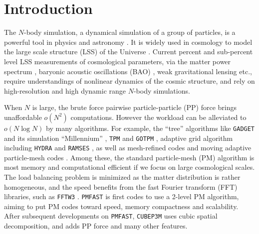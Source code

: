 \documentclass[10pt,twocolumn,preprint]{emulateapj}
\begin{document}
\maketitle


\section{Introduction}\label{s.intro}
The $N$-body simulation, a dynamical simulation of a group of particles, is a powerful tool in physics and astronomy \citep{1988csup.book.....H}. It is widely used in cosmology to model the large scale structure (LSS) of the Universe \citep{1985ApJ...292..371D}. Current percent and sub-percent level LSS measurements of cosmological parameters, via the matter power spectrum \citep{2005MNRAS.360L..82R,2011ApJ...726....7T}, baryonic acoustic oscillations (BAO) \citep{2005ApJ...633..560E,2009ApJ...700..479T}, weak gravitational lensing \citep{2003ApJ...592..699V,2009A&A...499...31H,2009ApJ...701..945S} etc., require understandings of nonlinear dynamics of the cosmic structure, and rely on high-resolution and high dynamic range $N$-body simulations.

When $N$ is large, the brute force pairwise particle-particle (PP) force brings unaffordable $o(N^2)$ computations. However the workload can be alleviated to $o(N\log N)$ by many algorithms. For example, the ``tree'' algorithms like {\tt GADGET} \citep{2001NewA....6...79S,2005MNRAS.364.1105S} and its simulation ``Millennium'' \citep{2005Natur.435..629S,2012MNRAS.426.2046A}, {\tt TPM} \citep{1995ApJS...98..355X} and {\tt GOTPM} \citep{2004NewA....9..111D}, adaptive grid algorithm including {\tt HYDRA} \citep{1995ApJ...452..797C} and {\tt RAMSES} \citep{2010ascl.soft11007T}, as well as mesh-refined codes \citep{1991ApJ...368L..23C} and moving adaptive particle-mesh codes \citep{1995ApJS..100..269P}. Among these, the standard particle-mesh (PM) algorithm \citep{1988csup.book.....H} is most memory and computational efficient if we focus on large cosmological scales. The load balancing problem is minimized as the matter distribution is rather homogeneous, and the speed benefits from the fast Fourier transform (FFT) libraries, such as {\tt FFTW3} \citep{Frigo05thedesign}. {\tt PMFAST} \citep{2005NewA...10..393M} is first codes to use a 2-level PM algorithm, aiming to put PM codes toward speed, memory compactness and scalability. After subsequent developments on {\tt PMFAST}, {\tt CUBEP3M} \citep{2013MNRAS.436..540H} uses cubic spatial decomposition, and adds PP force and many other features.
\end{document}
